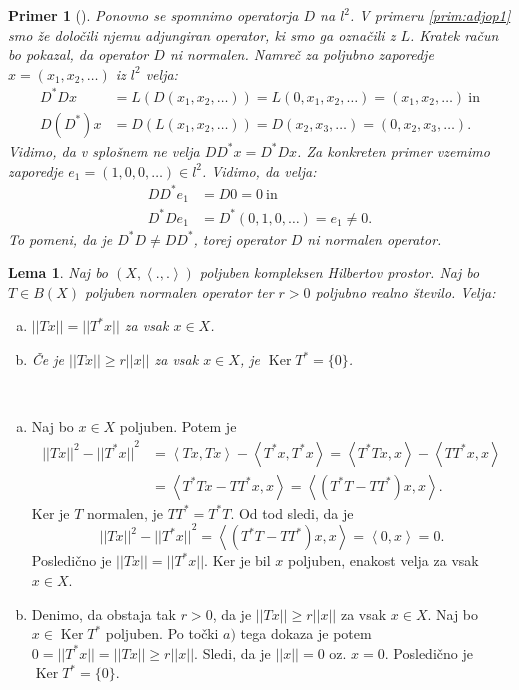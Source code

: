 \documentclass[12pt,a4paper,oneside,fleqn,openany]{book}
\newtheorem{lema}[izrek]{Lema}
\newtheorem{primer*}[izrek]{Primer}
\newcommand{\eopf}{\raisebox{0.8ex}{\framebox{}}} %
\newenvironment{dokaz}%
{\noindent{\bf Dokaz.}\ }%
{\hfill\eopf\par\bigskip}%
\newenvironment{primer}[1][]{\begin{primer*}[#1]\renewcommand*{\qedsymbol}{$\diamondsuit$}\pushQED{\qed}}{\popQED\end{primer*}}
\newcommand{\abs}[1]{\ensuremath{\lvert #1 \rvert}}
\newcommand{\norm}[1]{\abs{\abs{#1}}}
\newcommand{\Sp}[2]{\ensuremath{\left<#1, #2\right>}}
\newcommand{\Zap}[1]{\ensuremath{\left(#1_1, #1_2, \ldots \right)}}
\begin{document}
\begin{primer}
	\label{prim:Dninorm}
	Ponovno se spomnimo operatorja $D$ na $l^2$. V primeru \ref{prim:adjop1} smo že določili njemu adjungiran operator, ki smo ga označili z $L$. Kratek račun bo pokazal, da operator $D$ ni normalen. Namreč za poljubno zaporedje $x = (x_1, x_2, \ldots)$ iz $l^2$ velja: \begin{align*}
		D^*Dx &= L(D(x_1, x_2, \ldots))= L(0, x_1, x_2, \ldots)=(x_1, x_2, \ldots)~\text{in} \\
		D(D^*)x &= D(L\Zap{x}) = D(x_2, x_3, \ldots) = (0, x_2, x_3, \ldots).
	\end{align*}
	Vidimo, da v splošnem ne velja $DD^*x = D^*Dx$. Za konkreten primer vzemimo zaporedje $e_1 = (1, 0, 0, \ldots)\in l^2$. Vidimo, da velja: \begin{align*}
		DD^*e_1 &= D0 = 0~\text{in} \\
		D^*De_1 &= D^*(0, 1, 0, \ldots) = e_1 \neq 0.
	\end{align*} To pomeni, da je $D^*D \neq DD^*$, torej operator $D$ ni normalen operator.
\end{primer}

\begin{lema}
	\label{lem:normalnorm}
	Naj bo $(X, \Sp{.}{.})$ poljuben kompleksen Hilbertov prostor. Naj bo $T\in B(X)$ poljuben normalen operator ter $r > 0$ poljubno realno število. Velja: \begin{enumerate}[a)]
		\item $\norm{Tx} = \norm{T^*x}$ za vsak $x\in X$.
		\item Če je $\norm{Tx} \geq r\norm{x}$ za vsak $x\in X$, je $\operatorname{Ker}T^* = \{0\}$.
	\end{enumerate}
\end{lema}

\begin{dokaz}
	\begin{enumerate}[a)]
		\item Naj bo $x\in X$ poljuben. Potem je \begin{align*}
			\norm{Tx}^2 - \norm{T^*x}^2 &= \Sp{Tx}{Tx} - \Sp{T^*x}{T^*x} = \Sp{T^*Tx}{x} - \Sp{TT^*x}{x}\\
			&= \Sp{T^*Tx - TT^*x}{x} = \Sp{(T^*T - TT^*)x}{x}.
		\end{align*}
		Ker je $T$ normalen, je $TT^* = T^*T$. Od tod sledi, da je $$\norm{Tx}^2 - \norm{T^*x}^2 = \Sp{(T^*T - TT^*)x}{x} = \Sp{0}{x} = 0.$$
		Posledično je $\norm{Tx} = \norm{T^*x}$. Ker je bil $x$ poljuben, enakost velja za vsak $x\in X$.
		\item Denimo, da obstaja tak $r>0$, da je $\norm{Tx} \geq r\norm{x}$ za vsak $x\in X$. Naj bo $x\in \operatorname{Ker}T^*$ poljuben. Po točki $a)$ tega dokaza je potem $0 = \norm{T^*x} = \norm{Tx} \geq r\norm{x}$. Sledi, da je $\norm{x} = 0$ oz. $x = 0$. Posledično je $\operatorname{Ker}T^* = \{0\}$.
	\end{enumerate}
\end{dokaz}
\end{document}
